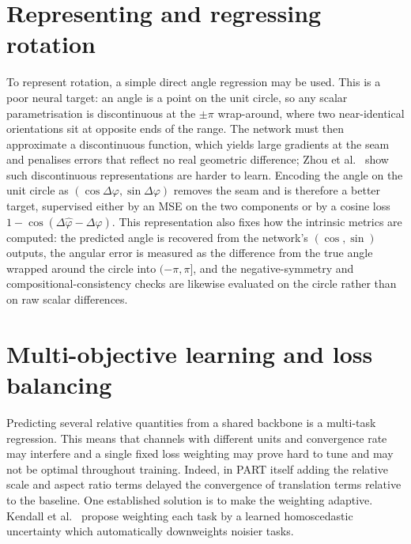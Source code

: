 \documentclass[11pt,a4paper]{report}
\begin{document}
\section{Representing and regressing rotation}
To represent rotation, a simple direct angle regression may be used. This is a poor neural target: an angle is a point on the unit circle, so any scalar parametrisation is discontinuous at the $\pm\pi$ wrap-around, where two near-identical orientations sit at opposite ends of the range. The network must then approximate a discontinuous function, which yields large gradients at the seam and penalises errors that reflect no real geometric difference; Zhou et al.~\cite{rotcont} show such discontinuous representations are harder to learn. Encoding the angle on the unit circle as $(\cos\Delta\varphi,\sin\Delta\varphi)$ removes the seam and is therefore a better target, supervised either by an MSE on the two components or by a cosine loss $1-\cos(\Delta\hat\varphi-\Delta\varphi)$. This representation also fixes how the intrinsic metrics are computed: the predicted angle is recovered from the network's $(\cos,\sin)$ outputs, the angular error is measured as the difference from the true angle wrapped around the circle into $(-\pi,\pi]$, and the negative-symmetry and compositional-consistency checks are likewise evaluated on the circle rather than on raw scalar differences.


\section{Multi-objective learning and loss balancing}
Predicting several relative quantities from a shared backbone is a multi-task regression. This means that channels with different units and convergence rate may interfere and a single fixed loss weighting may prove hard to tune and may not be optimal throughout training. Indeed, in PART\cite{part} itself adding the relative scale and aspect ratio terms delayed the convergence of translation terms relative to the baseline. One established solution is to make the weighting adaptive. Kendall et al.~\cite{kendall} propose weighting each task by a learned homoscedastic uncertainty which automatically downweights noisier tasks.
\end{document}
